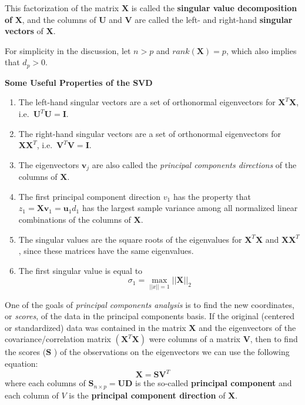 \documentclass[
]{book}
\begin{document}
This factorization of the matrix \(\mathbf{X}\) is called the \textbf{singular value decomposition of} \(\mathbf{X}\), and the columns of \(\mathbf{U}\) and \(\mathbf{V}\) are called the left- and right-hand \textbf{singular vectors} of \(\mathbf{X}\).

For simplicity in the discussion, let \(n>p\) and \(rank(\mathbf{X}) = p\), which also implies that \(d_p>0\).

\textbf{Some Useful Properties of the SVD}

\begin{enumerate}
\def\labelenumi{\arabic{enumi}.}
\item
  The left-hand singular vectors are a set of orthonormal eigenvectors for \(\mathbf{X}^T\mathbf{X}\), i.e.~\(\mathbf{U}^T\mathbf{U} = \mathbf{I}\).
\item
  The right-hand singular vectors are a set of orthonormal eigenvectors for \(\mathbf{X}\mathbf{X}^T\), i.e.~\(\mathbf{V}^T\mathbf{V}=\mathbf{I}\).
\item
  The eigenvectors \(\mathbf{v}_j\) are also called the \emph{principal components directions} of the columns of \(\mathbf{X}\).
\item
  The first principal component direction \(v_1\) has the property that \(z_1 = \mathbf{X} \mathbf{v}_1 = \mathbf{u}_1 d_1\) has the largest sample variance among all normalized linear combinations of the columns of \(\mathbf{X}\).
\item
  The singular values are the square roots of the eigenvalues for \(\mathbf{X}^T\mathbf{X}\) and \(\mathbf{X}\mathbf{X}^T\), since these matrices have the same eigenvalues.
\item
  The first singular value is equal to
  \[\sigma_1 = \max_{||x||=1} ||\mathbf{X}||_2\]
\end{enumerate}

One of the goals of \emph{principal components analysis} is to find the new coordinates, or \emph{scores}, of the data in the principal components basis. If the original (centered or standardized) data was contained in the matrix \(\mathbf{X}\) and the eigenvectors of the covariance/correlation matrix \((\mathbf{X}^T\mathbf{X})\) were columns of a matrix \(\mathbf{V}\), then to find the scores (\(\mathbf{S}\) ) of the observations on the eigenvectors we can use the following equation:
\[\mathbf{X} = \mathbf{S} \mathbf{V}^T\]
where each columns of \(\mathbf{S}_{n\times p} = \mathbf{U}\mathbf{D}\) is the
so-called \textbf{principal component} and each column of \(V\) is the \textbf{principal
component direction} of \(\mathbf{X}\).
\end{document}
